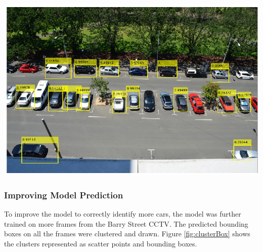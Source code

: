 \documentclass[man]{apa7}
\begin{document}
\begin{minipage}{\linewidth}
  \includegraphics[height=\textheight/2,width=\textwidth/1]{figures/modelPredictions.png}
  \label{fig:bStreetPredictions}
\end{minipage}

\subsubsection{Improving Model Prediction}

To improve the model to correctly identify more cars, the model was further trained on more frames from the Barry Street CCTV. The predicted bounding boxes on all the frames were clustered and drawn. Figure \ref{fig:clusterBox} shows the clusters represented as scatter points and bounding boxes.

\newpage
\end{document}
